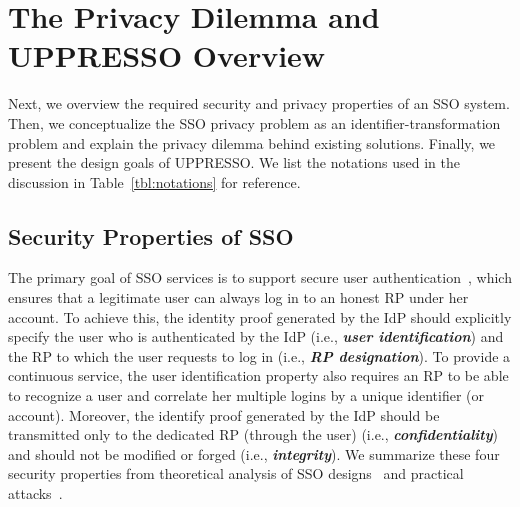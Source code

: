 \section{The Privacy Dilemma and UPPRESSO Overview}
\label{sec:challenge}
Next, we overview the required security and privacy properties of an SSO system. Then, we conceptualize the SSO privacy problem as an identifier-transformation problem and explain the privacy dilemma behind existing solutions. Finally, we present the design goals of UPPRESSO. %
We list the notations used in the discussion in Table~\ref{tbl:notations} for reference.

\subsection{Security Properties of SSO}
\label{subsec:basicrequirements}
The primary goal of SSO services is to support secure user authentication~\cite{SPRESSO}, which ensures that a legitimate user can always log in to an honest RP under her account.
To achieve this, the identity proof generated by the IdP should explicitly specify the user who is authenticated by the IdP (i.e., \textbf{\textit{user identification}}) and the RP to which the user requests to log in (i.e., \textbf{\textit{RP designation}}). To provide a continuous service, the user identification property also requires an RP to be able to recognize a user and correlate her multiple logins by a unique identifier (or account). Moreover, the identify proof generated by the IdP should be transmitted only to the dedicated RP (through the user) (i.e., \textbf{\textit{confidentiality}}) and should not be modified or forged (i.e., \textbf{\textit{integrity}}). We summarize these four security properties from theoretical analysis of SSO designs~\cite{ArmandoCCCT08,FettKS16, FettKS17} and practical attacks~\cite{SomorovskyMSKJ12, WangCW12, ArmandoCCCPS13, ZhouE14, WangZLLYLG15, WangZLG16, YangLLZH16, MainkaMS16, MainkaMSW17, YangLCZ18, YangLS17, ShiWL19, ChenPCTKT14, ccsSunB12, DiscoveringJCS, dimvaLiM16, CaoSBKVC14, TowardsShehabM14}.

